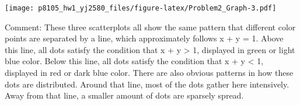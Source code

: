 \documentclass[]{article}
\begin{document}
\texttt{[image: p8105\_hw1\_yj2580\_files/figure-latex/Problem2\_Graph-3.pdf]}

Comment: These three scatterplots all show the same pattern that
different color points are separated by a line, which approximately
follows x + y = 1. Above this line, all dots satisfy the condition that
x + y \textgreater{} 1, displayed in green or light blue color. Below
this line, all dots satisfy the condition that x + y \textless{} 1,
displayed in red or dark blue color. There are also obvious patterns in
how these dots are distributed. Around that line, most of the dots
gather here intensively. Away from that line, a smaller amount of dots
are sparsely spread.
\end{document}
